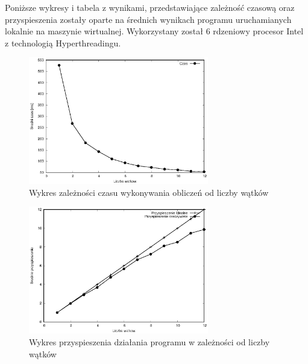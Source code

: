 \documentclass[a4paper,12pt]{article}
\begin{document}
Poniższe wykresy i tabela z wynikami, przedstawiające zależność czasową oraz przyspieszenia zostały oparte na średnich wynikach programu uruchamianych lokalnie na maszynie wirtualnej. Wykorzystany został 6 rdzeniowy procesor Intel z technologią Hyperthreadingu.

\begin{figure}[!ht]
	\centering
  \includegraphics[width=0.7\textwidth]{openMPWykresCzas.eps}
  \caption{Wykres zależności czasu wykonywania obliczeń od liczby wątków}
\end{figure}

\begin{figure}[!ht]
	\centering
  \includegraphics[width=0.7\textwidth]{openMPWykresPrzyspieszenie.eps}
  \caption{Wykres przyspieszenia działania programu w zależności od liczby wątków}
\end{figure}
\end{document}
